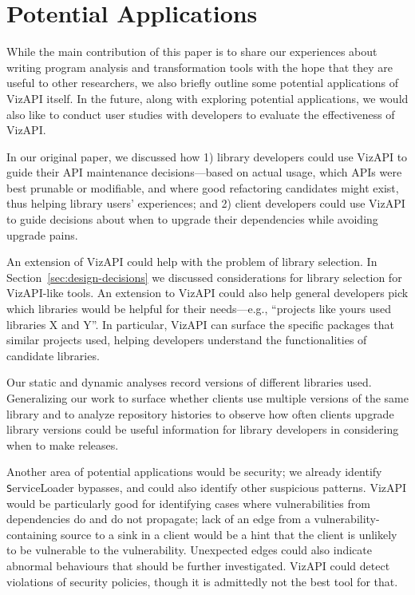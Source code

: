 \section{Potential Applications}
\label{sec:potential-applications}
While the main contribution of this paper is to share our experiences
about writing program analysis and transformation tools with the hope
that they are useful to other researchers, we also briefly outline
some potential applications of VizAPI itself. In the future, along
with exploring potential applications, we would also like to conduct
user studies with developers to evaluate the effectiveness of
VizAPI.

In our original paper, we discussed how 1) library developers could
use VizAPI to guide their API maintenance decisions---based on actual
usage, which APIs were best prunable or modifiable, and where good
refactoring candidates might exist, thus helping library users'
experiences; and 2) client developers could use VizAPI to guide
decisions about when to upgrade their dependencies while avoiding
upgrade pains.

An extension of VizAPI could help with the problem of library selection. In
Section~\ref{sec:design-decisions} we discussed considerations for library
selection for VizAPI-like tools. An extension to VizAPI could also help
general developers pick which libraries would be helpful for their
needs---e.g., ``projects like yours used libraries X and Y''. In particular,
VizAPI can surface the specific packages that similar projects used,
helping developers understand the functionalities of candidate libraries.

Our static and dynamic analyses record versions of different libraries used. 
Generalizing our work to surface whether clients use multiple versions of the same library and
to analyze repository histories to observe how often clients upgrade library versions 
could be useful information for library developers in considering when to make releases.

Another area of potential applications would be security; we already
identify {\texttt ServiceLoader} bypasses, and could also identify
other suspicious patterns. VizAPI would be particularly good for
identifying cases where vulnerabilities from dependencies do and do
not propagate; lack of an edge from a vulnerability-containing source
to a sink in a client would be a hint that the client is unlikely to be
vulnerable to the vulnerability. Unexpected edges could also indicate
abnormal behaviours that should be further investigated.
VizAPI could detect violations of
security policies, though it is admittedly not the best tool for that.

